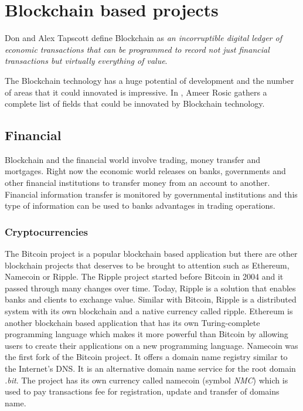 \chapter{Blockchain based projects}
\label{chapter:chapter3}
Don and Alex Tapscott \cite{blocknextinternet} define Blockchain as \emph{an incorruptible digital ledger of economic transactions that can be programmed to record not just financial transactions but virtually everything of value}.

The Blockchain technology has a huge potential of development and the number of areas that it could innovated is impressive. In \cite{blocktechguide}, Ameer Rosic gathers a complete list of fields that could be innovated by Blockchain technology.
\section{Financial}
\label{sub-sec:chapter2-subsection1}
Blockchain and the financial world involve trading, money transfer and mortgages. Right now the economic world releases on banks, governments and other
financial institutions to transfer money from an account to another. Financial information transfer is monitored by governmental institutions and this type of information can be used to banks advantages in trading operations.

\subsection{Cryptocurrencies}
\label{subsec:cryptoprojs}
The Bitcoin project is a popular blockchain based application but there are other blockchain projects that deserves to be brought to attention such as Ethereum, Namecoin or Ripple.
The Ripple project started before Bitcoin in 2004 and it passed through many changes over time. Today, Ripple is a solution that enables banks and clients to exchange value. Similar with Bitcoin, Ripple is a distributed system with its own blockchain and a native currency called ripple.
Ethereum is another blockchain based application that has its own Turing-complete programming language which makes it more powerful than Bitcoin by allowing users to create their applications on a new programming language.
Namecoin was the first fork of the Bitcoin project. It offers a domain name registry similar to the Internet’s DNS. It is an alternative domain name service for the root domain \emph{.bit}.
The project has its own currency called namecoin (symbol \emph{NMC}) which is used to pay transactions fee for registration, update and transfer of domains name.

